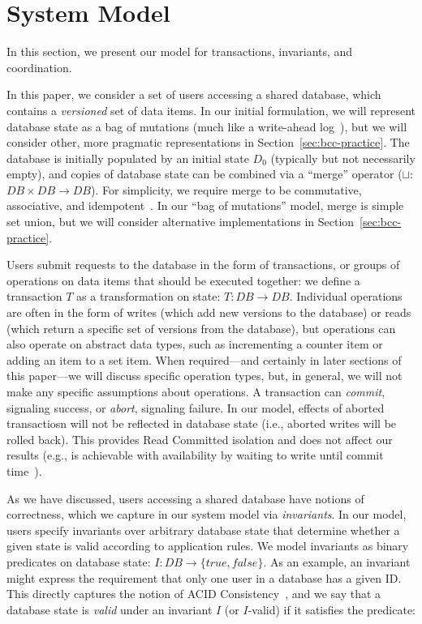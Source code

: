 
\section{System Model}
\label{sec:model}

In this section, we present our model for transactions, invariants,
and coordination.

 In this paper, we consider a set of users
accessing a shared database, which contains a \textit{versioned} set
of data items. In our initial formulation, we will represent database
state as a bag of mutations (much like a write-ahead
log~\cite{gray-book}), but we will consider other, more pragmatic
representations in Section~\ref{sec:bcc-practice}. The database is
initially populated by an initial state $D_0$ (typically but not
necessarily empty), and copies of database state can be combined via a
``merge'' operator ($\sqcup$: $DB \times DB \rightarrow DB$).  For
simplicity, we require merge to be commutative, associative, and
idempotent~\cite{calm,crdt}. In our ``bag of mutations'' model, merge
is simple set union, but we will consider alternative implementations
in Section~\ref{sec:bcc-practice}.

 Users submit requests to the database in the
form of transactions, or groups of operations on data items that
should be executed together: we define a transaction $T$ as a
transformation on state: $T: DB \rightarrow DB$. Individual operations
are often in the form of writes (which add new versions to the
database) or reads (which return a specific set of versions from the
database), but operations can also operate on abstract data types,
such as incrementing a counter item or adding an item to a set
item. When required---and certainly in later sections of this
paper---we will discuss specific operation types, but, in general, we
will not make any specific assumptions about operations. A transaction
can \textit{commit}, signaling success, or \textit{abort}, signaling
failure. In our model, effects of aborted transactiosn will not be
reflected in database state (i.e., aborted writes will be rolled
back). This provides Read Committed isolation and does not affect our
results (e.g., is achievable with availability by waiting to write
until commit time~\cite{hat-vldb,spanner}).

 As we have discussed, users accessing a shared
database have notions of correctness, which we capture in our system
model via \textit{invariants}. In our model, users specify invariants
over arbitrary database state that determine whether a given state is
valid according to application rules. We model invariants as binary
predicates on database state: $I: DB \rightarrow \{true, false\}$.  As
an example, an invariant might express the requirement that only one
user in a database has a given ID. This directly captures the notion
of ACID Consistency~\cite{bernstein-book,gray-virtues}, and we say
that a database state is \textit{valid} under an invariant $I$ (or
$I$-valid) if it satisfies the predicate:

